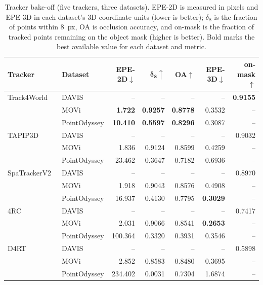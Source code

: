 \begin{table}[t]
\caption{Tracker bake-off (five trackers, three datasets). EPE-2D is measured in pixels and EPE-3D in each dataset's 3D coordinate units (lower is better); $\delta_8$ is the fraction of points within 8~px, OA is occlusion accuracy, and on-mask is the fraction of tracked points remaining on the object mask (higher is better). Bold marks the best available value for each dataset and metric.}
\label{tab:bakeoff}
\begin{center}
\footnotesize
\setlength{\tabcolsep}{3pt}
\begin{tabular}{llrrrrr}
\toprule
\textbf{Tracker} & \textbf{Dataset} & \textbf{EPE-2D}$\downarrow$ & $\boldsymbol{\delta_8}\uparrow$ & \textbf{OA}$\uparrow$ & \textbf{EPE-3D}$\downarrow$ & \textbf{on-mask}$\uparrow$ \\
\midrule
Track4World & DAVIS & -- & -- & -- & -- & \textbf{0.9155} \\
 & MOVi & \textbf{1.722} & \textbf{0.9257} & \textbf{0.8778} & 0.3532 & -- \\
 & PointOdyssey & \textbf{10.410} & \textbf{0.5597} & \textbf{0.8296} & 0.3087 & -- \\
\midrule
TAPIP3D~\citep{zhangTAPIP3DTrackingAny2025} & DAVIS & -- & -- & -- & -- & 0.9032 \\
 & MOVi & 1.836 & 0.9124 & 0.8599 & 0.4259 & -- \\
 & PointOdyssey & 23.462 & 0.3647 & 0.7182 & 0.6936 & -- \\
\midrule
SpaTrackerV2~\citep{xiaoSpatialTrackerV23DPoint2025} & DAVIS & -- & -- & -- & -- & 0.8970 \\
 & MOVi & 1.918 & 0.9043 & 0.8576 & 0.4908 & -- \\
 & PointOdyssey & 16.937 & 0.4130 & 0.7795 & \textbf{0.3029} & -- \\
\midrule
4RC~\citep{luo4RC4DReconstruction2026} & DAVIS & -- & -- & -- & -- & 0.7417 \\
 & MOVi & 2.031 & 0.9066 & 0.8541 & \textbf{0.2653} & -- \\
 & PointOdyssey & 100.364 & 0.3320 & 0.3931 & 0.3546 & -- \\
\midrule
D4RT~\citep{zhangEfficientlyReconstructingDynamic2025} & DAVIS & -- & -- & -- & -- & 0.5898 \\
 & MOVi & 2.852 & 0.8583 & 0.8480 & 0.3695 & -- \\
 & PointOdyssey & 234.402 & 0.0031 & 0.7304 & 1.6874 & -- \\
\bottomrule
\end{tabular}
\end{center}
\end{table}

